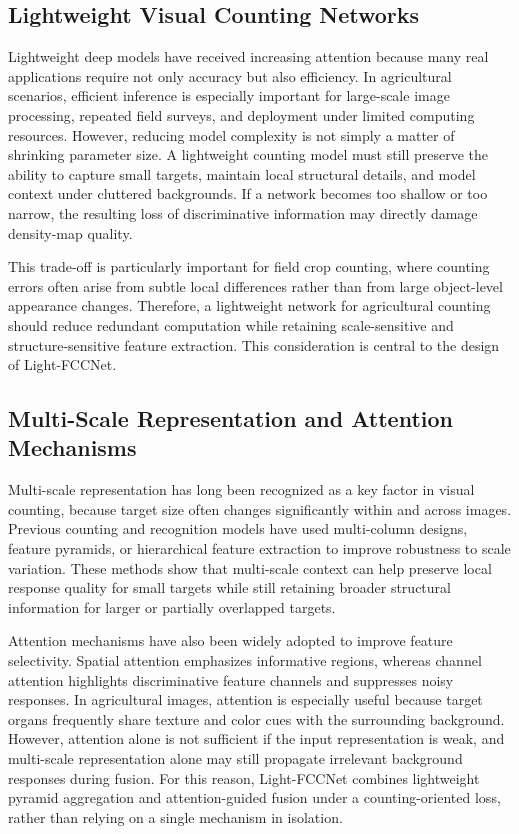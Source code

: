 \documentclass[a4paper,fleqn]{cas-sc}
\begin{document}
\subsection{Lightweight Visual Counting Networks}

Lightweight deep models have received increasing attention because many real applications require not only accuracy but also efficiency. In agricultural scenarios, efficient inference is especially important for large-scale image processing, repeated field surveys, and deployment under limited computing resources. However, reducing model complexity is not simply a matter of shrinking parameter size. A lightweight counting model must still preserve the ability to capture small targets, maintain local structural details, and model context under cluttered backgrounds. If a network becomes too shallow or too narrow, the resulting loss of discriminative information may directly damage density-map quality.

This trade-off is particularly important for field crop counting, where counting errors often arise from subtle local differences rather than from large object-level appearance changes. Therefore, a lightweight network for agricultural counting should reduce redundant computation while retaining scale-sensitive and structure-sensitive feature extraction. This consideration is central to the design of Light-FCCNet.

\subsection{Multi-Scale Representation and Attention Mechanisms}

Multi-scale representation has long been recognized as a key factor in visual counting, because target size often changes significantly within and across images. Previous counting and recognition models have used multi-column designs, feature pyramids, or hierarchical feature extraction to improve robustness to scale variation. These methods show that multi-scale context can help preserve local response quality for small targets while still retaining broader structural information for larger or partially overlapped targets.

Attention mechanisms have also been widely adopted to improve feature selectivity. Spatial attention emphasizes informative regions, whereas channel attention highlights discriminative feature channels and suppresses noisy responses. In agricultural images, attention is especially useful because target organs frequently share texture and color cues with the surrounding background. However, attention alone is not sufficient if the input representation is weak, and multi-scale representation alone may still propagate irrelevant background responses during fusion. For this reason, Light-FCCNet combines lightweight pyramid aggregation and attention-guided fusion under a counting-oriented loss, rather than relying on a single mechanism in isolation.
\end{document}
